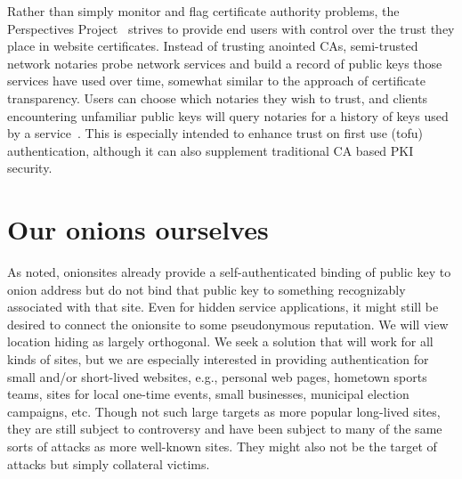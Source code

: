 \documentclass[10pt, conference, compsocconf]{styles/IEEEtran}
\begin{document}
Rather than simply monitor and flag certificate authority
problems, the Perspectives Project~\cite{perspectives} strives to
provide end users with control over the trust they place in website
certificates. Instead of trusting anointed CAs, semi-trusted network
notaries probe network services and build a record of public keys
those services have used over time, somewhat similar to the approach
of certificate transparency. Users can choose which notaries they wish
to trust, and clients encountering unfamiliar public keys will query
notaries for a history of keys used by a
service~\cite{perspectives-paper}. This is especially intended to
enhance trust on first use (tofu) authentication, although it can also
supplement traditional CA based PKI security. 





% 
% 
% 



\section{Our onions ourselves}

As noted, onionsites already provide a self-authenticated binding of
public key to onion address but do not bind that public key to
something recognizably associated with that site.  Even for hidden
service applications, it might still be desired to connect the
onionsite to some pseudonymous reputation.  We will view location hiding
as largely orthogonal.  We seek a solution
that will work for all kinds of sites, but we are especially
interested in providing authentication for small and/or short-lived
websites, e.g., personal web pages, hometown sports teams, sites for
local one-time events, small businesses, municipal election campaigns,
etc.  Though not such large targets as more popular long-lived sites, they are
still subject to controversy and have been subject to many of the same
sorts of attacks as more well-known sites.  They might also not be
the target of attacks but simply collateral victims. 
\end{document}
